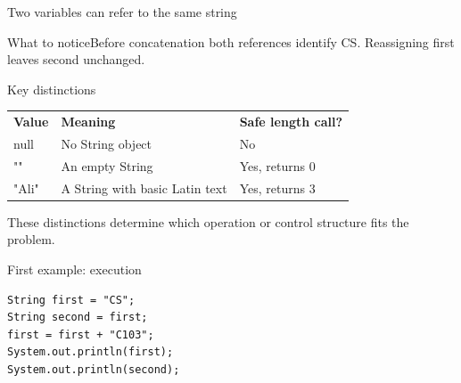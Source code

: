 \documentclass[10pt,aspectratio=169]{beamer}
\begin{document}
\begin{frame}[fragile,t]{Two variables can refer to the same string}
\begin{center}\end{center}
\begin{block}{What to notice}Before concatenation both references identify CS. Reassigning first leaves second unchanged.\end{block}
\end{frame}
\begin{frame}[fragile,t]{Key distinctions}
\small\renewcommand{\arraystretch}{1.5}
\begin{tabularx}{\textwidth}{>{\raggedright\arraybackslash}X>{\raggedright\arraybackslash}X>{\raggedright\arraybackslash}X}
\rowcolor{navy}
\color{white}\bfseries Value & \color{white}\bfseries Meaning & \color{white}\bfseries Safe length call?\\
null & No String object & No\\
"" & An empty String & Yes, returns 0\\
"Ali" & A String with basic Latin text & Yes, returns 3\\
\end{tabularx}
\vspace{3mm}\footnotesize These distinctions determine which operation or control structure fits the problem.
\end{frame}

\begin{frame}[fragile,t]{First example: execution}
\begin{lstlisting}
String first = "CS";
String second = first;
first = first + "C103";
System.out.println(first);
System.out.println(second);
\end{lstlisting}
\end{frame}
\end{document}
